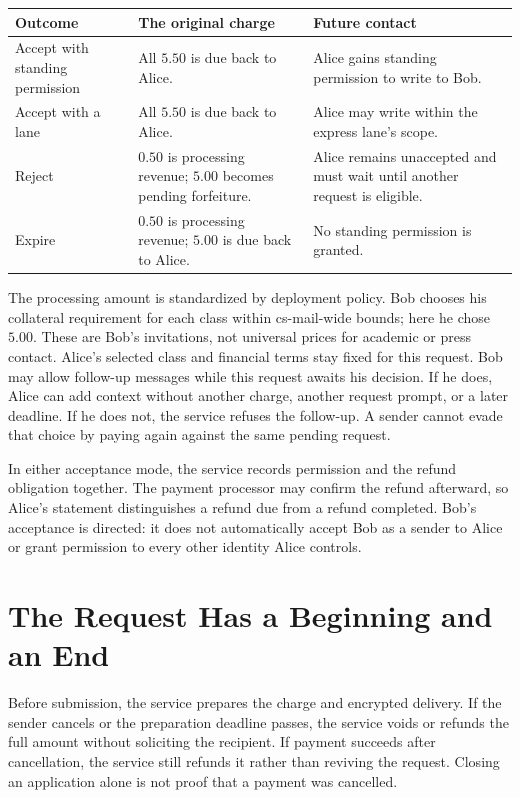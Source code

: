 \documentclass[11pt]{article}
\begin{document}
\begin{center}
\small
\begin{tabularx}{\textwidth}{@{}>{\raggedright\arraybackslash}p{}Y Y@{}}
\toprule
Outcome & The original charge & Future contact \\
\midrule
Accept with standing permission & All $5.50$ is due back to Alice. & Alice gains standing permission to write to Bob. \\
Accept with a lane & All $5.50$ is due back to Alice. & Alice may write within the express lane's scope. \\
Reject & $0.50$ is processing revenue; $5.00$ becomes pending forfeiture. & Alice remains unaccepted and must wait until another request is eligible. \\
Expire & $0.50$ is processing revenue; $5.00$ is due back to Alice. & No standing permission is granted. \\
\bottomrule
\end{tabularx}
\end{center}

The processing amount is standardized by deployment policy. Bob chooses his
collateral requirement for each class within cs-mail-wide bounds; here he chose
$5.00$. These are Bob's invitations, not universal prices for academic or press
contact. Alice's selected class and financial terms stay fixed for this request.
Bob may allow follow-up
messages while this request awaits his decision. If he does, Alice
can add context without another charge, another request prompt, or a later
deadline. If he does not, the service refuses the follow-up. A sender cannot
evade that choice by paying again against the same pending request.

In either acceptance mode, the service records permission and the refund obligation
together. The payment processor may confirm the refund afterward, so Alice's
statement distinguishes a refund due from a refund completed. Bob's acceptance
is directed: it does not automatically accept Bob as a sender to Alice or grant
permission to every other identity Alice controls.

\section{The Request Has a Beginning and an End}

Before submission, the service prepares the charge and encrypted delivery. If the sender cancels or the preparation deadline passes, the service voids or
refunds the full amount without soliciting the recipient. If payment succeeds after cancellation, the service
still refunds it rather than reviving the request. Closing an application alone
is not proof that a payment was cancelled.
\end{document}
